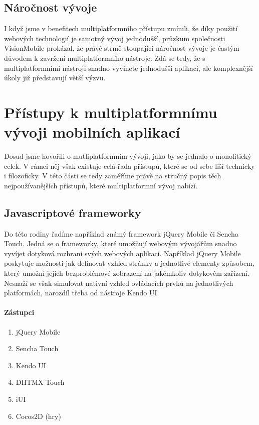 \subsection{Náročnost vývoje}
I když jsme v benefitech multiplatformního přístupu zmínili, že díky použití webových technologií je samotný vývoj jednodušší, průzkum společnosti VisionMobile \cite{visionmobile_survey} prokázal, že právě strmě stoupající náročnost vývoje je častým důvodem k zavržení multiplatformního nástroje. Zdá se tedy, že s multiplatformními nástroji snadno vyvinete jednodušší aplikaci, ale komplexnější úkoly již představují větší výzvu.

\section{Přístupy k multiplatformnímu vývoji mobilních aplikací}
Dosud jsme hovořili o mutliplatformním vývoji, jako by se jednalo o monolitický celek. V rámci něj však existuje celá řada přístupů, které se od sebe liší technicky i filozoficky. V této části se tedy zaměříme právě na stručný popis těch nejpoužívanějších přístupů, které multiplatformní vývoj nabízí.

\subsection{Javascriptové frameworky}
Do této rodiny řadíme například známý framework jQuery Mobile či Sencha Touch. Jedná se o frameworky, které umožňují webovým vývojářům snadno vyvíjet dotyková rozhraní svých webových aplikací. Například jQuery Mobile poskytuje možnosti jak definovat vzhled stránky a jednotlivé elementy způsobem, který umožní jejich bezproblémové zobrazení na jakémkoliv dotykovém zařízení. Nesnaží se však simulovat nativní vzhled ovládacích prvků na jednotlivých platformách, narozdíl třeba od nástroje Kendo UI.

\paragraph{Zástupci}
\begin{enumerate}
	\item jQuery Mobile
	\item Sencha Touch
	\item Kendo UI
	\item DHTMX Touch
	\item iUI
	\item Cocos2D (hry)
\end{enumerate}

